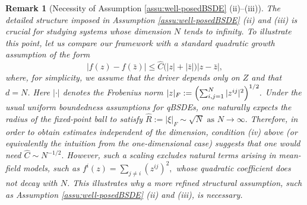 \documentclass[10pt,a4paper]{article}
\theoremstyle{plain}
\newtheorem{Remark}[Theorem]{Remark}
\theoremstyle{definition}
\numberwithin{equation}{section}
\begin{document}
 
    

\begin{Remark}[Necessity of Assumption \ref{assu:well-posedBSDE} (ii)--(iii)]
The detailed structure imposed in Assumption \ref{assu:well-posedBSDE} \textnormal{(ii)} and \textnormal{(iii)} is crucial for studying systems whose dimension \(N\) tends to infinity. To illustrate this point, let us compare our framework with a standard quadratic growth assumption of the form
\[
|f(z)-f(\bar{z})|
\leq
\hat{C} \bigl(|z|+|\bar{ z}|\bigr)|z-\bar{ z}|,
\]
where, for simplicity, we assume that the driver depends only on \(Z\) and that \(d=N\). Here \( |\cdot| \) denotes the Frobenius norm
$
|z|_F
:=
\Bigl(
\sum_{i,j=1}^N |z^{ij}|^2
\Bigr)^{1/2}.
$
Under the usual uniform boundedness assumptions for qBSDEs, one naturally expects the radius of the fixed-point ball to satisfy
$
\hat R := |\xi|_F \sim \sqrt{N}
\text{ as } N\to\infty.
$
Therefore, in order to obtain estimates independent of the dimension, condition \textnormal{(iv)} above (or equivalently the intuition from the one-dimensional case) suggests that one would need
$
\hat C \sim N^{-1/2}.
$
However, such a scaling excludes natural terms arising in mean-field models, such as
$
f^i(z)=\sum_{j \neq i} (z^{ij})^2,
$
whose quadratic coefficient does not decay with \(N\). This illustrates why a more refined structural assumption, such as Assumption \ref{assu:well-posedBSDE} \textnormal{(ii)} and \textnormal{(iii)}, is necessary. 
\end{Remark}

\end{document}
